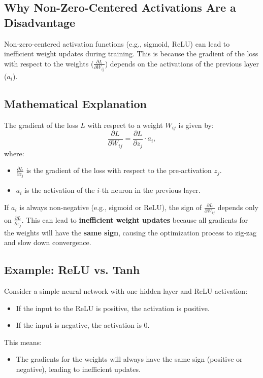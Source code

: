 \begin{notechapter}
\section{Why Non-Zero-Centered Activations Are a Disadvantage}
Non-zero-centered activation functions (e.g., sigmoid, ReLU) can lead to
inefficient weight updates during training. This is because the gradient of the
loss with respect to the weights (\(\frac{\partial L}{\partial W_{ij}}\)) depends
on the activations of the previous layer (\(a_i\)).

\subsection{Mathematical Explanation}
The gradient of the loss \(L\) with respect to a weight \(W_{ij}\) is given by:
\[
\frac{\partial L}{\partial W_{ij}} = \frac{\partial L}{\partial z_j} \cdot a_i,
\]
where:
\begin{itemize}[leftmargin=*]
    \item \(\frac{\partial L}{\partial z_j}\) is the gradient of the loss with
    respect to the pre-activation \(z_j\).
    \item \(a_i\) is the activation of the \(i\)-th neuron in the previous layer.
\end{itemize}

If \(a_i\) is always non-negative (e.g., sigmoid or ReLU), the sign of
\(\frac{\partial L}{\partial W_{ij}}\) depends only on \(\frac{\partial L}{\partial z_j}\).
This can lead to \textbf{inefficient weight updates} because all gradients for the
weights will have the \textbf{same sign}, causing the optimization process to
zig-zag and slow down convergence.

\subsection{Example: ReLU vs. Tanh}
Consider a simple neural network with one hidden layer and ReLU activation:
\begin{itemize}[leftmargin=*]
    \item If the input to the ReLU is positive, the activation is positive.
    \item If the input is negative, the activation is 0.
\end{itemize}

This means:
\begin{itemize}[leftmargin=*]
    \item The gradients for the weights will always have the same sign (positive
    or negative), leading to inefficient updates.
\end{itemize}


\end{notechapter}
